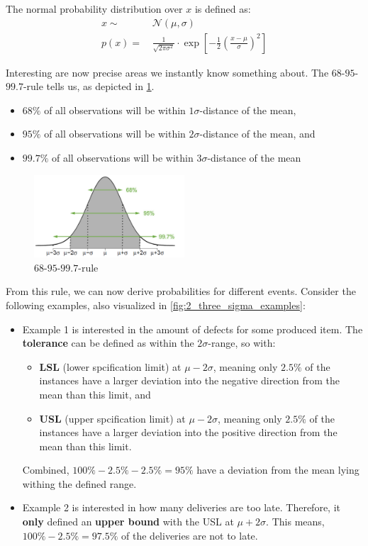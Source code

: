 The normal probability distribution over $x$ is defined as:
\begin{align*}
  x \sim&\, \mathcal{N}(\mu, \sigma) \\
  p(x) = &\,\frac{1}{\sqrt{2\pi \sigma^2}} \cdot \exp\left[ -\frac{1}{2}\left(\frac{x-\mu}{\sigma}\right)^2 \right]
\end{align*}

Interesting are now precise areas we instantly know something about. The $68$-$95$-$99.7$-rule tells us, as depicted in \ref{fig:2_three_sigma}.
\begin{itemize}
  \item $68\%$ of all observations will be within $1\sigma$-distance of the mean,
  \item $95\%$ of all observations will be within $2\sigma$-distance of the mean, and
  \item $99.7\%$ of all observations will be within $3\sigma$-distance of the mean
\end{itemize}

\begin{figure}[H]
  \centering
  \includegraphics[width=0.5\textwidth]{assets/visualization_and_extraction/norm_rule.png}
  \caption{$68$-$95$-$99.7$-rule}
  \label{fig:2_three_sigma}
\end{figure}

From this rule, we can now derive probabilities for different events. Consider the following examples, also visualized in \ref{fig:2_three_sigma_examples}:
\begin{itemize}
  \item Example 1 is interested in the amount of defects for some produced item. The \textbf{tolerance} can be defined as within the $2\sigma$-range, so with:
  \begin{itemize}
    \item \textbf{LSL} (lower spcification limit) at $\mu-2\sigma$, meaning only $2.5\%$ of the instances have a larger deviation into the negative direction from the mean than this limit, and
    \item \textbf{USL} (upper spcification limit) at $\mu-2\sigma$, meaning only $2.5\%$ of the instances have a larger deviation into the positive direction from the mean than this limit.
  \end{itemize}
  Combined, $100\%-2.5\%-2.5\%=95\%$ have a deviation from the mean lying withing the defined range.
  \item Example 2 is interested in how many deliveries are too late. Therefore, it \textbf{only} defined an \textbf{upper bound} with the USL at $\mu+2\sigma$. This means, $100\%-2.5\%=97.5\%$ of the deliveries are not to late.
\end{itemize}

